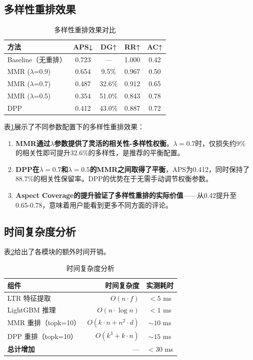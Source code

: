 \documentclass[10pt,a4paper]{article}
\begin{document}
\subsection{多样性重排效果}

\begin{table}[H]
\centering
\caption{多样性重排效果对比}
\label{tab:diversity}
\begin{tabular}{@{}lcccc@{}}
\toprule
\textbf{方法} & \textbf{APS↓} & \textbf{DG↑} & \textbf{RR↑} & \textbf{AC↑} \\
\midrule
Baseline（无重排）& 0.723 & —     & 1.000 & 0.42 \\
MMR ($\lambda$=0.9) & 0.654 & 9.5\%  & 0.967 & 0.50 \\
MMR ($\lambda$=0.7) & 0.487 & 32.6\% & 0.912 & 0.65 \\
MMR ($\lambda$=0.5) & 0.354 & 51.0\% & 0.843 & 0.78 \\
DPP                  & 0.412 & 43.0\% & 0.887 & 0.72 \\
\bottomrule
\end{tabular}
\end{table}

表\ref{tab:diversity}展示了不同参数配置下的多样性重排效果：

\begin{enumerate}[leftmargin=*]
    \item \textbf{MMR通过$\lambda$参数提供了灵活的相关性-多样性权衡}。$\lambda=0.7$时，仅损失约9\%的相关性即可提升32.6\%的多样性，是推荐的平衡配置。
    \item \textbf{DPP在$\lambda=0.7$和$\lambda=0.5$的MMR之间取得了平衡}，APS为0.412，同时保持了88.7\%的相关性保留率。DPP的优势在于无需手动调节权衡参数。
    \item \textbf{Aspect Coverage的提升验证了多样性重排的实际价值}——从0.42提升至0.65-0.78，意味着用户能看到更多不同方面的评论。
\end{enumerate}

\subsection{时间复杂度分析}

表\ref{tab:complexity}给出了各模块的额外时间开销。

\begin{table}[H]
\centering
\caption{时间复杂度分析}
\label{tab:complexity}
\begin{tabular}{@{}lrc@{}}
\toprule
\textbf{组件} & \textbf{时间复杂度} & \textbf{实测耗时} \\
\midrule
LTR 特征提取 & $O(n \cdot f)$ & $<5$ ms \\
LightGBM 推理 & $O(n \cdot \log n)$ & $<1$ ms \\
MMR 重排（topk=10） & $O(k \cdot n + n^2 \cdot d)$ & $\sim10$ ms \\
DPP 重排（topk=10）& $O(k^3 + k \cdot n)$ & $\sim15$ ms \\
\hline
\textbf{总计增加} & — & $<30$ ms \\
\bottomrule
\end{tabular}
\end{table}
\end{document}
